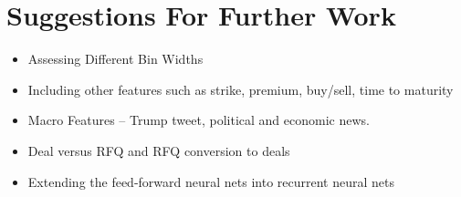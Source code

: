\chapter{Suggestions For Further Work}

\begin{itemize}
    \item Assessing Different Bin Widths
    \item Including other features such as strike, premium, buy/sell, time to maturity
    \item Macro Features -- Trump tweet, political and economic news.
    \item Deal versus RFQ and RFQ conversion to deals
    \item Extending the feed-forward neural nets into recurrent neural nets
\end{itemize}
